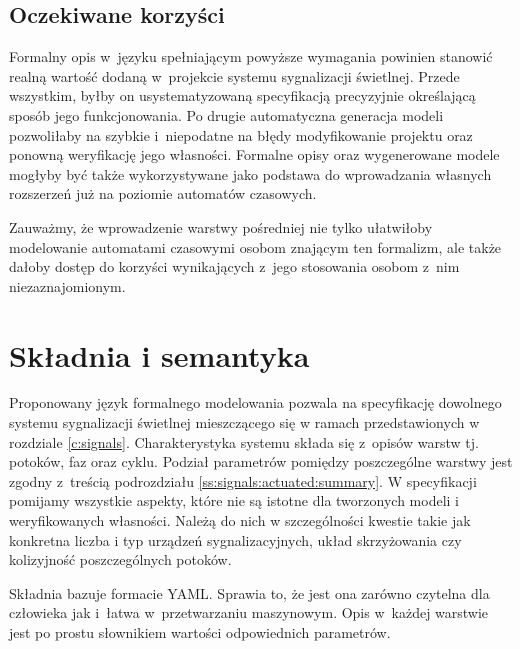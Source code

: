 \documentclass{pracamgr}
\theoremstyle{plain}
\begin{document}
\subsection{Oczekiwane korzyści}
\label{ss:lang:req:benefits}
Formalny opis w~języku spełniającym powyższe wymagania powinien
stanowić realną wartość dodaną w~projekcie systemu sygnalizacji
świetlnej. Przede wszystkim, byłby on usystematyzowaną
specyfikacją precyzyjnie określającą sposób jego funkcjonowania. Po
drugie automatyczna generacja modeli pozwoliłaby na szybkie
i~niepodatne na błędy modyfikowanie projektu oraz ponowną weryfikację jego
własności. Formalne opisy oraz wygenerowane modele mogłyby być także
wykorzystywane jako podstawa do wprowadzania własnych rozszerzeń już
na poziomie automatów czasowych.

Zauważmy, że wprowadzenie warstwy pośredniej nie tylko ułatwiłoby
modelowanie automatami czasowymi osobom znającym ten formalizm, ale
także dałoby dostęp do korzyści wynikających z~jego stosowania osobom
z~nim niezaznajomionym.


\section{Składnia i semantyka}
\label{c:lang:lang}

Proponowany język formalnego modelowania pozwala na specyfikację
dowolnego systemu sygnalizacji świetlnej mieszczącego się w ramach
przedstawionych w rozdziale \ref{c:signals}. Charakterystyka
systemu składa się z~opisów warstw tj. potoków, faz oraz
cyklu. Podział parametrów pomiędzy poszczególne warstwy jest zgodny
z~treścią podrozdziału \ref{ss:signals:actuated:summary}. W
specyfikacji pomijamy wszystkie aspekty, które nie są istotne dla
tworzonych modeli i weryfikowanych własności. Należą do nich w
szczególności kwestie takie jak konkretna liczba i typ urządzeń
sygnalizacyjnych, układ skrzyżowania czy kolizyjność poszczególnych
potoków.

Składnia bazuje formacie YAML\cite{YAML}. Sprawia to, że jest ona
zarówno czytelna dla człowieka jak i~łatwa w~przetwarzaniu
maszynowym. Opis w~każdej warstwie jest po prostu słownikiem wartości
odpowiednich parametrów.
\end{document}
